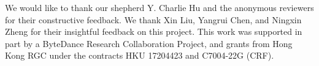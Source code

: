\documentclass[sigplan,10pt]{acmart}
\begin{document}



\maketitle














\vspace{-1mm}
\begin{acks}
We would like to thank our shepherd Y. Charlie Hu and the anonymous reviewers for their constructive feedback. 
We thank Xin Liu, Yangrui Chen, and Ningxin Zheng for their insightful feedback on this project.
This work was supported in part by a ByteDance Research Collaboration Project, and grants from Hong Kong RGC under the contracts HKU 17204423 and C7004-22G (CRF).
\end{acks}




\appendix



\end{document}
